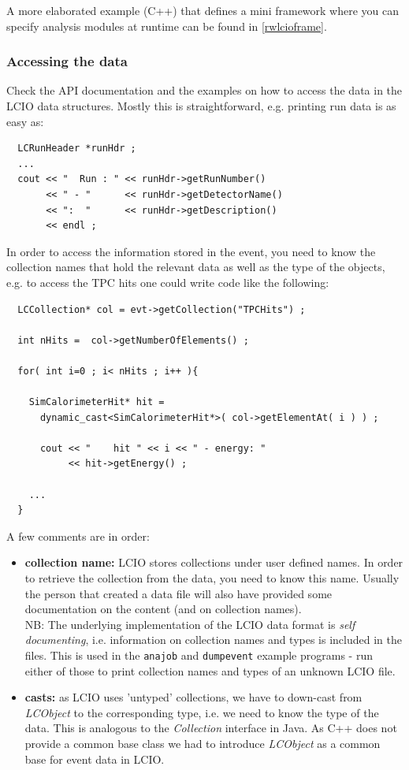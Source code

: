 \documentclass[twoside]{article}
\begin{document}
A more elaborated example (C++) that defines a mini framework where you can specify analysis modules at 
runtime can be found in \ref{rwlcioframe}.

\subsubsection{Accessing the data}
Check the API documentation and the examples on how to access the data in the LCIO data structures.
Mostly this is straightforward, e.g. printing run data is as easy as:

\begin{verbatim}
  LCRunHeader *runHdr ;
  ...  
  cout << "  Run : " << runHdr->getRunNumber() 
       << " - "      << runHdr->getDetectorName() 
       << ":  "      << runHdr->getDescription()  
       << endl ;
\end{verbatim}

In order to access the information stored in the event, you need to know the collection names that 
hold the relevant data as well as the type of the objects, e.g. to access the TPC hits one could 
write code like the following:

\begin{verbatim}
  LCCollection* col = evt->getCollection("TPCHits") ;

  int nHits =  col->getNumberOfElements() ;

  for( int i=0 ; i< nHits ; i++ ){

    SimCalorimeterHit* hit = 
      dynamic_cast<SimCalorimeterHit*>( col->getElementAt( i ) ) ;

      cout << "    hit " << i << " - energy: "  
           << hit->getEnergy() ;

    ...
  }
\end{verbatim}

A few comments are in order:
\begin{itemize}
\item{ {\bf collection name:} LCIO stores collections under user defined names. In order to retrieve 
the collection from the data, you need to know this name. Usually the person that created a data 
file will also have provided some documentation on the content (and on collection names). \\
NB: The underlying implementation of the LCIO data format is {\em self documenting}, i.e. information
on collection names and types is included in the files. This is used in the \verb$anajob$ and 
\verb$dumpevent$ example programs - run either of those to print collection names and 
types of an unknown LCIO file.
}

\item{ {\bf casts:} as LCIO uses 'untyped' collections, we have to down-cast from {\em LCObject} to 
the corresponding type, i.e. we need to know the type of the data. This is analogous to the 
{\em Collection} interface in Java. As C++ does not provide a common base class we had to 
introduce {\em LCObject} as a common base for event data in LCIO.
}

\end {itemize}
\end{document}
